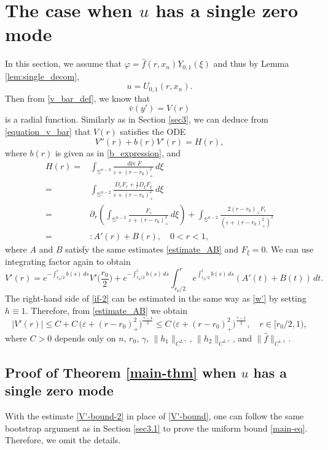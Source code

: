 \documentclass[reqno, 10pt]{amsart}
\theoremstyle{plain}
\theoremstyle{definition}
\theoremstyle{remark}
\newcommand{\dv}{\operatorname{div}}
\numberwithin{equation}{section}
\newcommand{\bS}{\mathbb{S}}
\begin{document}
\section{The case when \texorpdfstring{$u$}{u} has a single zero mode}\label{sec4}
In this section, we assume that $\varphi=\hat{f}(r,x_n)Y_{0,1}(\xi)$ and thus by Lemma \ref{lem:single_decom},
\begin{equation*}%
    u=U_{0,1}(r,x_n).
\end{equation*}
Then from \eqref{v_bar_def}, we know that
$$
\bar{v}(y') = V(r)
$$
is a radial function. Similarly as in Section \ref{sec3}, we can deduce from \eqref{equation_v_bar} that $V(r)$ satisfies the ODE
\begin{equation*}%
V''(r) + b(r)V'(r) = H(r),
\end{equation*}
 where $b(r)$ is given as in \eqref{b_expression}, and
\begin{align*}
H(r) =& \int_{\bS^{n-2}} \frac{\dv F}{\varepsilon+(r-r_0)_+^2} \, d\xi \\
=& \int_{\bS^{n-2}} \frac{D_r F_r + \frac{1}{r} D_\xi F_\xi}{\varepsilon + (r-r_0)_+^2} \, d\xi\\
=& \partial_r \left(\int_{\bS^{n-2}} \frac{F_r}{\varepsilon + (r-r_0)_+^2}  \, d\xi \right) + \int_{\bS^{n-2}} \frac{2(r-r_0)_+F_r}{(\varepsilon+(r-r_0)_+^2)^2}\\
=&: A'(r) + B(r), \quad 0 < r < 1,
\end{align*}
where $A$ and $B$ satisfy the same estimates \eqref{estimate_AB} and $F_\xi=0$. We can use integrating factor again to obtain
\begin{equation}\label{if-2}
V'(r) = e^{-\int_{r_0/2}^r b(s) \, ds} V'\Big(\frac{r_0}{2}\Big) + e^{-\int_{r_0/2}^r b(s) \, ds} \int_{r_0/2}^r e^{\int_{r_0/2}^t b(s) \, ds} (A'(t) + B(t)) \, dt.
\end{equation}
The right-hand side of \eqref{if-2} can be estimated in the same way as \eqref{w'} by setting $h \equiv 1$. Therefore, from \eqref{estimate_AB} we obtain
\begin{equation}\label{V'-bound-2}
    | V'(r)|  \le C+C\,\big(\varepsilon + (r-r_0)_+^2\big)^{\frac{\gamma-1}2} \le C\,\big(\varepsilon + (r-r_0)_+^2\big)^{\frac{\gamma-1}2}, \quad  r\in [r_0/2, 1),
\end{equation}
where $C>0$ depends only on $n$, $r_0$, $\gamma$, $\|h_1\|_{C^{2,\gamma}}$, $\|h_2\|_{C^{2,\gamma}}$, and $\|\hat{f}\|_{C^{1,1}}$.
\subsection{Proof of Theorem \ref{main-thm} when \texorpdfstring{$u$}{u} has a single zero mode}
With the estimate \eqref{V'-bound-2} in place of \eqref{V'-bound}, one can follow the same bootstrap argument as in Section \ref{sec3.1} to prove the uniform bound \eqref{main-eq}. Therefore, we omit the details.
\end{document}
